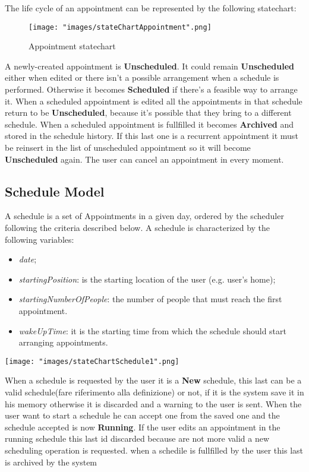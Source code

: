 The life cycle of an appointment can be represented by the following statechart:
\begin{figure}[H]
\begin{center}
\texttt{[image: "images/stateChartAppointment".png]}
\caption{Appointment statechart}
\label{fig:stchartApp}
\end{center}
\end{figure}

A newly-created appointment is \textbf{Unscheduled}. It could remain \textbf{Unscheduled} either when edited or there isn't a possible arrangement when a schedule is performed. Otherwise it becomes \textbf{Scheduled} if there's a feasible way to arrange it. When a scheduled appointment is edited all the appointments in that schedule return to be \textbf{Unscheduled}, because it's possible that they bring to a different schedule. When a scheduled appointment is fullfilled it becomes \textbf{Archived} and stored in the schedule history. If this last one is a recurrent appointment it must be reinsert in the list of unscheduled appointment so it will become \textbf{Unscheduled} again. The user can cancel an appointment in every moment. 

\subsection{Schedule Model} \label{subsect:schmodel}
A schedule is a set of Appointments in a given day, ordered by the scheduler following the criteria described below.
A schedule is characterized by the following variables:
\begin{itemize}
\item \textit{date};
\item \textit{startingPosition}: is the starting location of the user (e.g. user's home);
\item \textit{startingNumberOfPeople}: the number of people that must reach the first appointment.
\item \textit{wakeUpTime}: it is the starting time from which the schedule should start arranging appointments.
\end{itemize}

\texttt{[image: "images/stateChartSchedule1".png]}

When a schedule is requested by the user it is a \textbf{New} schedule, this last can be a valid schedule(fare riferimento alla definizione) or not, if it is the system save it in his memory otherwise it is discarded and a warning to the user is sent. When the user want to start a schedule he can accept one from the saved one and the schedule accepted is now \textbf{Running}. If the user edits an appointment in the running schedule this last id discarded because are not more valid a new scheduling operation is requested. when a schedile is fullfilled by the user this last is archived by the system

